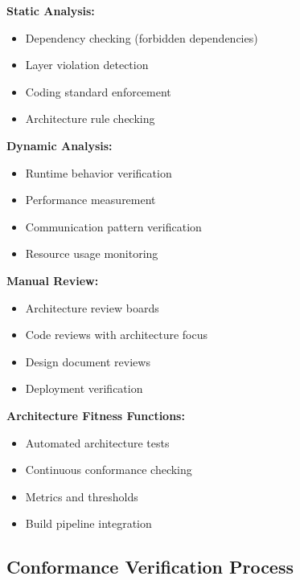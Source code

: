 \documentclass[11pt]{article}
\begin{document}
\begin{conformancebox}

\textbf{Static Analysis:}
\begin{itemize}[nosep]
    \item Dependency checking (forbidden dependencies)
    \item Layer violation detection
    \item Coding standard enforcement
    \item Architecture rule checking
\end{itemize}

\textbf{Dynamic Analysis:}
\begin{itemize}[nosep]
    \item Runtime behavior verification
    \item Performance measurement
    \item Communication pattern verification
    \item Resource usage monitoring
\end{itemize}

\textbf{Manual Review:}
\begin{itemize}[nosep]
    \item Architecture review boards
    \item Code reviews with architecture focus
    \item Design document reviews
    \item Deployment verification
\end{itemize}

\textbf{Architecture Fitness Functions:}
\begin{itemize}[nosep]
    \item Automated architecture tests
    \item Continuous conformance checking
    \item Metrics and thresholds
    \item Build pipeline integration
\end{itemize}
\end{conformancebox}

\subsection{Conformance Verification Process}
\end{document}
